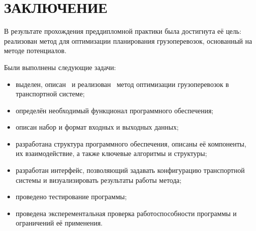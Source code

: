 \section*{ЗАКЛЮЧЕНИЕ}
	В результате прохождения преддипломной практики была достигнута её цель: реализован метод для оптимизации планирования грузоперевозок, основанный на методе потенциалов.
	
	Были выполнены следующие задачи:
	\begin{itemize}
		\item выделен, описан \, и реализован \, метод оптимизации грузоперевозок в \, транспортной системе;
		\item определён необходимый функционал программного обеспечения;
		\item описан набор и формат входных и выходных данных;
		\item разработана структура программного обеспечения, описаны её компоненты, их взаимодействие, а также ключевые алгоритмы и структуры;
		\item разработан интерфейс, позволяющий задавать конфигурацию транспортной системы и визуализировать результаты работы метода;
		\item проведено тестирование программы;
		\item проведена эксперементальная проверка работоспособности программы и ограничений её применения.
	\end{itemize}

\pagebreak
